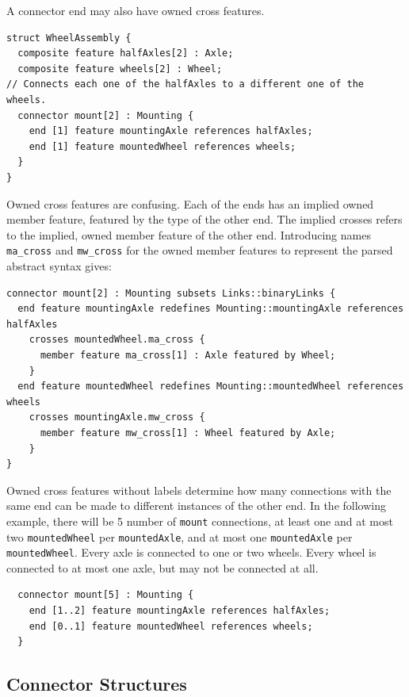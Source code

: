 \pn A connector end may also have owned cross features.

\begin{lstlisting}
struct WheelAssembly {
  composite feature halfAxles[2] : Axle;
  composite feature wheels[2] : Wheel;
// Connects each one of the halfAxles to a different one of the wheels.
  connector mount[2] : Mounting {
    end [1] feature mountingAxle references halfAxles;
    end [1] feature mountedWheel references wheels;
  }
}
\end{lstlisting}

\pn  Owned cross features are confusing.  Each of the ends has an implied owned member feature, featured by the type of the other end.  The implied crosses refers to the implied, owned member feature of the other end.  Introducing names \texttt{ma\_cross} and \texttt{mw\_cross} for the owned member features to represent the parsed abstract syntax gives:

\begin{lstlisting}
connector mount[2] : Mounting subsets Links::binaryLinks {
  end feature mountingAxle redefines Mounting::mountingAxle references halfAxles
    crosses mountedWheel.ma_cross {
      member feature ma_cross[1] : Axle featured by Wheel;
    }
  end feature mountedWheel redefines Mounting::mountedWheel references wheels
    crosses mountingAxle.mw_cross {  
      member feature mw_cross[1] : Wheel featured by Axle;
    }
}
\end{lstlisting}

\pn Owned cross features without labels determine how many connections with the same end can be made to different instances of the other end.
In the following example, there will be 5 number of \texttt{mount} connections, at least one and at most two \texttt{mountedWheel} per \texttt{mountedAxle}, and at most one \texttt{mountedAxle} per \texttt{mountedWheel}.  Every axle is connected to one or two wheels.  Every wheel is connected to at most one axle, but may not be connected at all.

\begin{lstlisting}
  connector mount[5] : Mounting {
    end [1..2] feature mountingAxle references halfAxles;
    end [0..1] feature mountedWheel references wheels;
  }
\end{lstlisting}

\subsection{Connector Structures}

